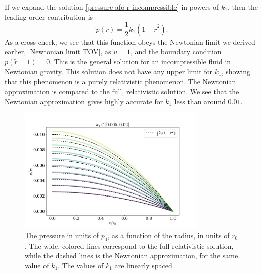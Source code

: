  
If we expand the solution \autoref{pressure afo r incompressible} in powers of $k_1$, then the leading order contribution is
%
\begin{equation}
    \tilde p(r) = \frac{1}{2} k_1 (1 - \tilde r^2).
\end{equation}
%
As a cross-check, we see that this function obeys the Newtonian limit we derived earlier, \autoref{Newtonian limit TOV}, as $\tilde u = 1$, and the boundary condition $p(\tilde r = 1) = 0$.
This is the general solution for an incompressible fluid in Newtonian gravity.
This solution does not have any upper limit for $k_1$, showing that this phenomenon is a purely relativistic phenomenon.
The Newtonian approximation is compared to the full, relativistic solution.
We see that the Newtonian approximation gives highly accurate  for $k_1$ less than around $0.01$.


\begin{figure}[h]
    \centering
    \includegraphics[width=0.8\textwidth]{../scripts/figurer/incompressible_newt.pdf}
    \caption{The pressure in units of $p_0$, as a function of the radius, in units of $r_0$. The wide, colored lines correspond to the full relativistic solution, while the dashed lines is the Newtonian approximation, for the same value of $k_1$. The values of $k_1$ are linearly spaced.  }
    \label{fig: pressure incompressible fluid newtonian}
\end{figure}

